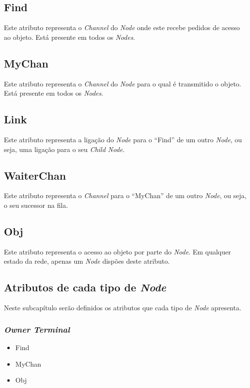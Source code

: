 \subsection*{Find}
\label{especificacao:atr:Find}
    Este atributo representa o \emph{Channel} do \emph{Node} onde este recebe pedidos de acesso ao objeto.
    Está presente em todos os \emph{Nodes}.

\subsection*{MyChan}
\label{especificacao:atr:mychan}
    Este atributo representa o \emph{Channel} do \emph{Node} para o qual é transmitido o objeto.
    Está presente em todos os \emph{Nodes}.

\subsection*{Link}
\label{especificacao:atr:link}
Este atributo representa a ligação do \emph{Node} para o ``Find'' de um outro \emph{Node}, ou seja, uma ligação para o seu \emph{Child Node}.

\subsection*{WaiterChan}
\label{especificacao:atr:waiterchan}
    Este atributo representa o \emph{Channel} para o ``MyChan'' de um outro \emph{Node}, ou seja, o seu sucessor na fila.

\subsection*{Obj}
\label{especificacao:atr:obj}
    Este atributo representa o acesso ao objeto por parte do \emph{Node}.
    Em qualquer estado da rede, apenas um \emph{Node} dispões deste atributo.


\subsection*{Atributos de cada tipo de \emph{Node}}
Neste subcapítulo serão definidos os atributos que cada tipo de \emph{Node} apresenta.


\subsubsection*{\emph{Owner Terminal}}
\begin{itemize}
    \item Find
    \item MyChan
    \item Obj
\end{itemize}
